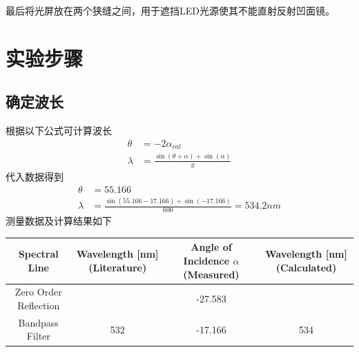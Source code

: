 \documentclass{ctexart}
\begin{document}
最后将光屏放在两个狭缝之间，用于遮挡LED光源使其不能直射反射凹面镜。

\section{实验步骤}
\subsection{确定波长}
根据以下公式可计算波长
\begin{align}
    \theta &= -2 \alpha_{cal} \\
    \lambda &= \frac{\sin(\theta+\alpha)+\sin(\alpha)}{g}
\end{align}
代入数据得到
\begin{align}
    \theta &= 55.166 \\
    \lambda &= \frac{\sin(55.166-17.166)+\sin(-17.166)}{600} = 534.2nm
\end{align}
测量数据及计算结果如下
\begin{table}[h]
    \centering
    \begin{tabular}{|c|c|c|c|}
        \hline
        \rowcolor{yellow!25} Spectral Line & Wavelength [nm] (Literature)  & Angle of Incidence $\alpha$ (Measured) & Wavelength [nm] (Calculated)   \\
        \hline
        Zero Order Reflection & \- & -27.583 & \-  \\
        \hline
        Bandpass Filter & 532 & -17.166 & 534  \\
        \hline
    \end{tabular}
\end{table}
\end{document}

